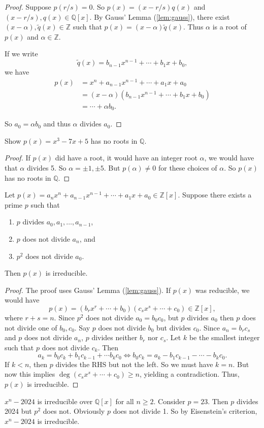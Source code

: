 \begin{proof}
	Suppose $p(r/s)=0$. So $p(x)=(x-r/s)q(x)$ and $(x-r/s),q(x)\in\mathbb Q[x]$. By Gauss' Lemma (\ref{lem:gauss}), there exist $(x-\alpha),\tilde q(x)\in\mathbb Z$ such that $p(x)=(x-\alpha)\tilde q(x)$. Thus $\alpha$ is a root of $p(x)$ and $\alpha\in\mathbb Z$.

	If we write
	$$\tilde q(x)=b_{n-1}x^{n-1}+\cdots+b_1x+b_0,$$
	we have
	\begin{align*}
		p(x)&=x^n+a_{n-1}x^{n-1}+\cdots+a_1x+a_0\\
		&=(x-\alpha)(b_{n-1}x^{n-1}+\cdots+b_1x+b_0)\\
		&=\cdots +\alpha b_0.
	\end{align*}

	So $a_0=\alpha b_0$ and thus $\alpha$ divides $a_0$.
\end{proof}

\begin{example}
	Show $p(x)=x^3-7x+5$ has no roots in $\mathbb Q$.

	\begin{proof}
		If $p(x)$ did have a root, it would have an integer root $\alpha$, we would have that $\alpha$ divides 5. So $\alpha=\pm 1,\pm 5$. But $p(\alpha)\neq 0$ for these choices of $\alpha$. So $p(x)$ has no roots in $\mathbb Q$.
	\end{proof}
\end{example}

\begin{theorem}\label{thm:eisenstein}
	Let $p(x)=a_nx^n+a_{n-1}x^{n-1}+\cdots+a_1x+a_0\in\mathbb Z[x]$. Suppose there exists a prime $p$ such that
	\begin{enumerate}
		\item $p$ divides $a_0,a_1,\hdots,a_{n-1}$,
		\item $p$ does not divide $a_n$, and
		\item $p^2$ does not divide $a_0$.
	\end{enumerate}
	Then $p(x)$ is irreducible.
\end{theorem}

\begin{proof}
	The proof uses Gauss' Lemma (\ref{lem:gauss}). If $p(x)$ was reducible, we would have
	$$p(x)=(b_rx^r+\cdots +b_0)(c_sx^s+\cdots+c_0)\in\mathbb Z[x],$$
	where $r+s=n$. Since $p^2$ does not divide $a_0=b_0c_0$, but $p$ divides $a_0$ then $p$ does not divide one of $b_0,c_0$. Say $p$ does not divide $b_0$ but divides $c_0$. Since $a_n=b_rc_s$ and $p$ does not divide $a_n$, $p$ divides neither $b_r$ nor $c_s$. Let $k$ be the smallest integer such that $p$ does not divide $c_k$. Then
	$$a_k=b_0c_k+b_1c_{k-1}+\cdots b_kc_0\Leftrightarrow b_0c_k=a_k-b_1c_{k-1}-\cdots -b_kc_0.$$
	If $k<n$, then $p$ divides the RHS but not the left. So we must have $k=n$. But now this implies $\deg(c_sx^s+\cdots +c_0)\geq n$, yielding a contradiction. Thus, $p(x)$ is irreducible.
\end{proof}

\begin{example}
	$x^n-2024$ is irreducible over $\mathbb Q[x]$ for all $n\geq 2$. Consider $p=23$. Then $p$ divides 2024 but $p^2$ does not. Obviously $p$ does not divide 1. So by Eisenstein's criterion, $x^n-2024$ is irreducible.
\end{example}
